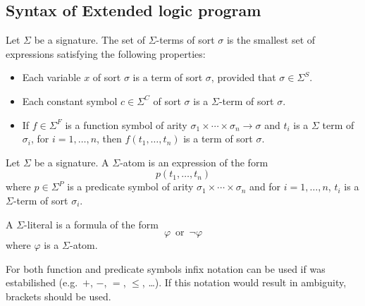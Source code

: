 \subsection{Syntax of Extended logic program}

\begin{definition}
    Let $\Sigma$ be a signature. The set of $\Sigma$-terms of sort $\sigma$
    is the smallest set of expressions satisfying the following properties:
    \begin{itemize}
        \item Each variable $x$ of sort $\sigma$ is a term of sort $\sigma$, provided that $\sigma\in \Sigma^S$.
        \item Each constant symbol $c\in \Sigma^C$ of sort $\sigma$ is a $\Sigma$-term of sort $\sigma$.
        \item If $f\in \Sigma^F$ is a function symbol of arity $\sigma_1\times\cdots\times \sigma_n\to \sigma$
            and $t_i$ is a $\Sigma$ term of $\sigma_i$, for $i=1,\ldots, n$, then $f(t_1,\ldots,t_n)$ is a term of sort $\sigma$.
    \end{itemize}
\end{definition}

\begin{definition}
    Let $\Sigma$ be a signature.
    A $\Sigma$-atom is an expression of the form
    \begin{equation*}
        p(t_1, \ldots, t_n)
    \end{equation*}
    where $p\in \Sigma^P$ is a predicate symbol of arity $\sigma_1\times\cdots\times\sigma_n$
    and for $i=1,\ldots,n$, $t_i$ is a $\Sigma$-term of sort $\sigma_i$.

    A $\Sigma$-literal is a formula of the form
    \begin{equation*}
        \varphi\, \text{ or } \,\neg\varphi
    \end{equation*}
    where $\varphi$ is a $\Sigma$-atom.
\end{definition}

For both function and predicate symbols infix notation can be used if was estabilished
(e.g.\ $+$, $-$, $=$, $\leq$, \ldots). If this notation would result in ambiguity, brackets should be used.


